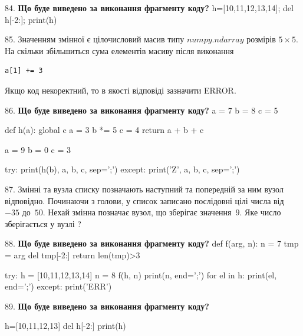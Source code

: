 \documentclass[11pt]{article}
\begin{document}
84. \textbf{Що буде виведено за виконання фрагменту коду?}
h=[10,11,12,13,14]; del h[-2:]; print(h)\par\vspace{5mm}

85. 
Значенням змінної  є цілочисловий масив типу $numpy.ndarray$ розмірів $5{\times}5$. На скільки збільшиться сума елементів масиву  після виконання
\begin{verbatim}
a[1] += 3
\end{verbatim}


Якщо код некоректний, то в якості відповіді зазначити ERROR.


\par\vspace{5mm}

86. \textbf{Що буде виведено за виконання фрагменту коду?}
a = 7
b = 8
c = 5

def h(a):
global c    a = 3
    b *= 5
    c = 4
    return a + b + c

a = 9
b = 0
c = 3

try:
    print(h(b), a, b, c, sep=';')
except:
    print('Z', a, b, c, sep=';')
\par\vspace{5mm}

87. 
Змінні  та  вузла списку позначають наступний та попередній за ним вузол відповідно. Починаючи з голови, у список записано послідовні цілі числа від~$-35$ до~$50$. Нехай змінна  позначає вузол, що зберігає значення~$9$.
Яке число зберігається у вузлі  ?
\par\vspace{5mm}

88. \textbf{Що буде виведено за виконання фрагменту коду?}
def f(arg, n):
    n = 7
    tmp = arg
    del tmp[-2:]
    return len(tmp)>3

try:
    h = [10,11,12,13,14]
    n = 8
    f(h, n)
    print(n, end=';')
    for el in h:
        print(el, end=';')
except:
    print('ERR')
\par\vspace{5mm}

89. \textbf{Що буде виведено за виконання фрагменту коду?}

h=[10,11,12,13]
del h[-2:]
print(h)

\par\vspace{5mm}
\end{document}
